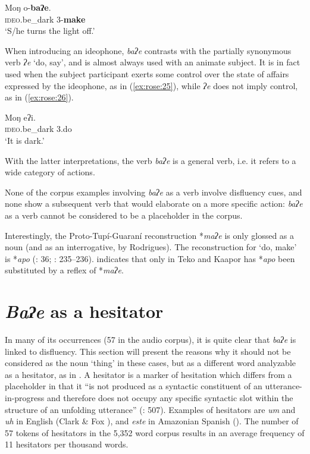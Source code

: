 \documentclass[output=paper]{langscibook}
\begin{document}
\ea \label{ex:rose:25}
\gll Moŋ   o-\textbf{baʔe}.\\
\textsc{ideo}.be\_dark   3-\textbf{make}\\
\glt ‘S/he turns the light off.’ 
\z 

When introducing an ideophone, \textit{baʔe} contrasts with the partially synonymous verb \textit{ʔe} ‘do, say’, and is almost always used with an animate subject. It is in fact used when the subject participant exerts some control over the state of affairs expressed by the ideophone, as in (\ref{ex:rose:25}), while \textit{ʔe} does not imply control, as in (\ref{ex:rose:26}).


\ea \label{ex:rose:26}
\gll Moŋ   eʔi.\\
\textsc{ideo}.be\_dark   3.do\\
\glt ‘It is dark.’ 
\z 

With the latter interpretations, the verb \textit{baʔe} is a general verb, i.e. it refers to a wide category of actions.

None of the corpus examples involving \textit{baʔe} as a verb involve disfluency cues, and none show a subsequent verb that would elaborate on a more specific action: \textit{baʔe} as a verb cannot be considered to be a placeholder in the corpus.

Interestingly, the Proto-Tupí-Guaraní reconstruction *\textit{maʔe} is only glossed as a noun (and as an interrogative, by Rodrigues). The reconstruction for ‘do, make’ is *\textit{apo} (\citealt{Rodrigues1984}: 36; \citealt{Mello2000}: 235--236). \citet[236]{Mello2000} indicates that only in Teko and Kaapor has *\textit{apo} been substituted by a reflex of *\textit{maʔe}.


\section{\textit{Baʔe} as a hesitator}
\label{sec:rose:3}

In many of its occurrences (57 in the audio corpus), it is quite clear that \textit{baʔe} is linked to disfluency. This section will present the reasons why it should not be considered as the noun ‘thing’ in these cases, but as a different word analyzable as a hesitator, as in . A hesitator is a marker of hesitation which differs from a placeholder in that it “is not produced as a syntactic constituent of an utterance-in-progress and therefore does not occupy any specific syntactic slot within the structure of an unfolding utterance” (\citealt{HayashiYoon2006}: 507). Examples of hesitators are \textit{um} and \textit{uh} in English (Clark \& Fox \citealt{Tree2002}), and \textit{este} in Amazonian Spanish (\citealt{VallejosYopán2023}). The number of 57 tokens of hesitators in the 5,352 word corpus results in an average frequency of 11 hesitators per thousand words.
\end{document}
